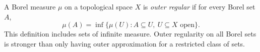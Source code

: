 
A Borel measure $\mu$ on a topological space $X$ is \emph{outer regular} if for every Borel set $A$,
\[
\mu(A)=\inf\{\mu(U):A\subseteq U,\ U\subseteq X\text{ open}\}.
\]
This definition includes sets of infinite measure. Outer regularity on all Borel sets is stronger than only having outer approximation for a restricted class of sets.
